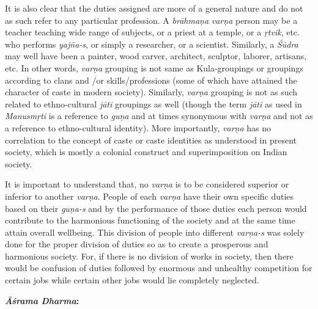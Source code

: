 It is also clear that the duties assigned are more of a general nature and do not as such refer to any particular profession. A \emph{brāhmaṇa} \emph{varṇa} person may be a teacher teaching wide range of subjects, or a priest at a temple, or a \emph{ṛtvik}, etc. who performs \emph{yajña-s}, or simply a researcher, or a scientist. Similarly, a \emph{Śūdra} may well have been a painter, wood carver, architect, sculptor, laborer, artisans, etc. In other words, \emph{varṇa} grouping is not same as Kula-groupings or groupings according to clans and /or skills/professions (some of which have attained the character of caste in modern society). Similarly, \emph{varṇa} grouping is not as such related to ethno-cultural \emph{jāti} groupings as well (though the term \emph{jāti} as used in \emph{Manusmṛti} is a reference to \emph{guṇa} and at times synonymous with \emph{varṇa} and not as a reference to ethno-cultural identity). More importantly, \emph{varṇa} has no correlation to the concept of caste or caste identities as understood in present society, which is mostly a colonial construct and superimposition on Indian society.

It is important to understand that, no \emph{varṇa} is to be considered superior or inferior to another \emph{varṇa}. People of each \emph{varṇa} have their own specific duties based on their \emph{guṇa-s} and by the performance of those duties each person would contribute to the harmonious functioning of the society and at the same time attain overall wellbeing. This division of people into different \emph{varṇa-s} was solely done for the proper division of duties so as to create a prosperous and harmonious society. For, if there is no division of works in society, then there would be confusion of duties followed by enormous and unhealthy competition for certain jobs while certain other jobs would lie completely neglected.

\textbf{\emph{Āśrama} \emph{Dharma}:}

